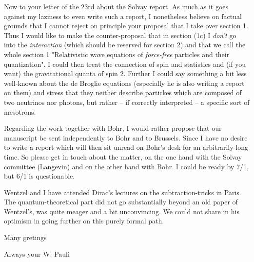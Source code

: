 Now to your letter of the 23rd about the Solvay report. As much as it goes against my laziness to even write such a report, I nonetheless believe on factual grounds that I cannot reject on principle your proposal that I take over section 1. Thus I would like to make the counter-proposal that in section (1c) I \textit{don't} go into the \textit{interaction} (which should be reserved for section 2) and that we call the whole section 1 "Relativistic wave equations of \textit{force-free} particles and their quantization". I could then treat the connection of spin and statistics and (if you want) the gravitational quanta of spin 2. Further I could say something a bit less well-known about the de Broglie equations (especially  he is also writing a report on them) and stress that they neither describe partickes which are composed of two neutrinos nor photons, but rather -- if correctly interpreted -- a specific sort of mesotrons.

Regarding the work together with Bohr, I would rather propose that our manuscript be sent independently to Bohr and to Brussels. Since I have no desire to write a report which will then sit unread on Bohr's desk for an arbitrarily-long time. So please get in touch about the matter, on the one hand with the Solvay committee (Langevin) and on the other hand with Bohr. I could be ready by 7/1, but 6/1 is questionable.

Wentzel and I have attended Dirac's lectures on the subtraction-tricks in Paris. The quantum-theoretical part did not go substantially beyond an old paper of Wentzel's, was quite meager and a bit unconvincing. We could not share in his optimism in going further on this purely formal path.

Many gretings 

Always your W. Pauli

